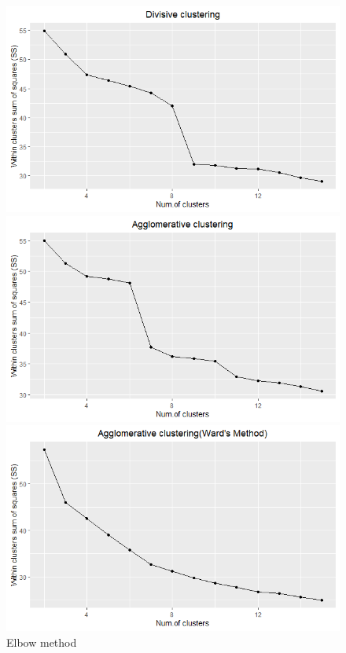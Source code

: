 \begin{figure}[!htb]
   \begin{minipage}{0.8\textwidth}
     \centering
     \includegraphics[width=1\linewidth]{image/elb_div.png}
   \end{minipage}\hfill
   \begin{minipage}{0.8\textwidth}
     \centering
     \includegraphics[width=1\linewidth]{image/elb_agg_c.png}
   \end{minipage}
   \begin{minipage}{0.8\textwidth}
     \centering
     \includegraphics[width=1\linewidth]{image/elb_agg_w.png}
   \end{minipage}
   \caption{Elbow method}\label{elb}
\end{figure}

